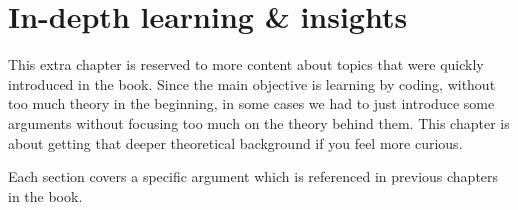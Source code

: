 %
%
%

\chapter[Solutions]{In-depth learning \& insights}
\label{sec:indepthlearn}

This extra chapter is reserved to more content about topics that were quickly introduced in the book.
Since the main objective is learning by coding, without too much theory in the beginning, in
some cases we had to just introduce some arguments without focusing too much on the theory behind
them. This chapter is about getting that deeper theoretical background if you feel more curious.

Each section covers a specific argument which is referenced in previous chapters in the book.



